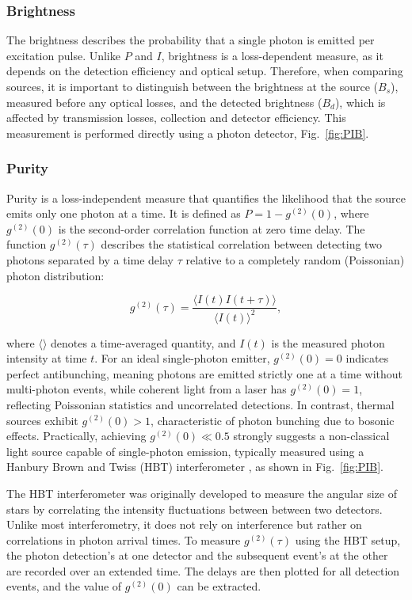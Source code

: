 \subsubsection{Brightness}

The brightness describes the probability that a single photon is emitted per excitation pulse. Unlike $P$ and $I$, brightness is a loss-dependent measure, as it depends on the detection efficiency and optical setup. Therefore, when comparing sources, it is important to distinguish between the brightness at the source ($B_s$), measured before any optical losses, and the detected brightness ($B_d$), which is affected by transmission losses, collection and detector efficiency. This measurement is performed directly using a photon detector, Fig.~\ref{fig:PIB}.

\subsubsection{\label{sec:purity} Purity}
Purity is a loss-independent measure that quantifies the likelihood that the source emits only one photon at a time. It is defined as $P = 1 - g^{(2)}(0)$, where $g^{(2)}(0)$ is the second-order correlation function at zero time delay. The function $g^{(2)}(\tau)$ describes the statistical correlation between detecting two photons separated by a time delay $\tau$ relative to a completely random (Poissonian) photon distribution:

\begin{equation}
    g^{(2)}(\tau) = \frac{\langle I(t)I(t+\tau)\rangle}{\langle I(t)\rangle^2},
    \label{eqn:g2}
\end{equation}

where $\langle \rangle$ denotes a time-averaged quantity, and $I(t)$ is the measured photon intensity at time $t$. For an ideal single-photon emitter, $g^{(2)}(0) = 0$ indicates perfect antibunching, meaning photons are emitted strictly one at a time without multi-photon events, while coherent light from a laser has $g^{(2)}(0) = 1$, reflecting Poissonian statistics and uncorrelated detections. In contrast, thermal sources exhibit $g^{(2)}(0) > 1$, characteristic of photon bunching due to bosonic effects. Practically, achieving $g^{(2)}(0) \ll 0.5$ strongly suggests a non-classical light source capable of single-photon emission, typically measured using a Hanbury Brown and Twiss (HBT) interferometer \cite{Brown1956}, as shown in Fig.~\ref{fig:PIB}.


The HBT interferometer was originally developed to measure the angular size of stars \cite{HanburyBrown1956} by correlating the intensity fluctuations between between two detectors. Unlike most interferometry, it does not rely on interference but rather on correlations in photon arrival times. To measure $g^{(2)}(\tau)$ using the HBT setup, the photon detection's at one detector and the subsequent event's at the other are recorded over an extended time. The delays are then plotted for all detection events, and the value of $g^{(2)}(0)$ can be extracted.


